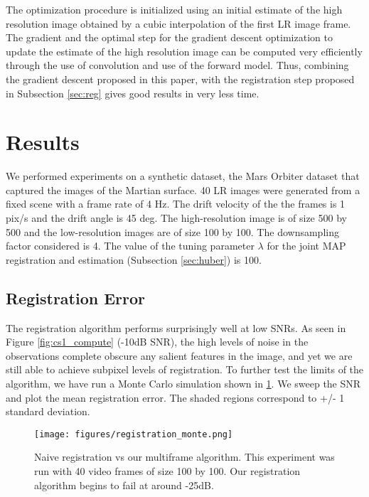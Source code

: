 \documentclass[10pt,twocolumn,letterpaper]{article}
\begin{document}
The optimization procedure is initialized using an initial estimate of the high resolution image obtained by a cubic interpolation of the first LR image frame. The gradient and the optimal step for the gradient descent optimization to update the estimate of the high resolution image can be computed very efficiently through the use of convolution and use of the forward model. Thus, combining the gradient descent proposed in this paper, with the registration step proposed in Subsection \ref{sec:reg} gives good results in very less time. 

\section{Results}

We performed experiments on a synthetic dataset, the Mars Orbiter dataset that captured the images of the Martian surface. 40 LR images were generated from a fixed scene with a frame rate of 4 Hz. The drift velocity of the the frames is 1 pix/s and the drift angle is 45 deg. The high-resolution image is of size 500 by 500 and the low-resolution images are of size 100 by 100. The downsampling factor considered is 4. The value of the tuning parameter $\lambda$ for the joint MAP registration and estimation (Subsection \ref{sec:huber}) is 100.  

\subsection{Registration Error}

The registration algorithm performs surprisingly well at low SNRs.  As seen in Figure \ref{fig:cs1_compute} (-10dB SNR), the high levels of noise in the observations complete obscure any salient features in the image, and yet we are still able to achieve subpixel levels of registration.  To further test the limits of the algorithm, we have run a Monte Carlo simulation shown in \ref{fig:registration_monte}.  We sweep the SNR and plot the mean registration error.  The shaded regions correspond to +/- 1 standard deviation.

\begin{figure}[ht]
    \texttt{[image: figures/registration\_monte.png]}
    \caption{Naive registration vs our multiframe algorithm.  This experiment was run with 40 video frames of size 100 by 100.  Our registration algorithm begins to fail at around -25dB.}
    \label{fig:registration_monte}
\end{figure}
\end{document}
